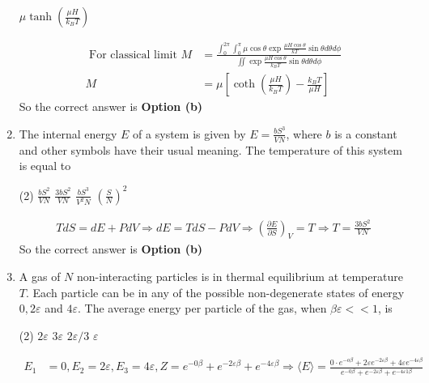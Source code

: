 \begin{enumerate}
\begin{tasks}
		\task[\textbf{d.}] $\mu \tanh \left(\frac{\mu H}{k_{B} T}\right)$
	\end{tasks}
	\begin{answer}
		\begin{align*}
		\text { For classical limit } M&=\frac{\int_{0}^{2 \pi} \int_{0}^{\pi} \mu \cos \theta \exp \frac{\mu H \cos \theta}{k T} \sin \theta d \theta d \phi}{\iint \exp \frac{\mu H \cos \theta}{k_{B} T} \sin \theta d \theta d \phi} \\
		M&=\mu\left[\operatorname{coth}\left(\frac{\mu H}{k_{B} T}\right)-\frac{k_{B} T}{\mu H}\right]
		\end{align*}
		So the correct answer is \textbf{Option (b)}
	\end{answer}
	\item 	The internal energy $E$ of a system is given by $E=\frac{b S^{3}}{V N}$, where $b$ is a constant and other symbols have their usual meaning. The temperature of this system is equal to
	{	}
	\begin{tasks}(2)
		\task[\textbf{a.}]$\frac{b S^{2}}{V N}$
		\task[\textbf{b.}]$\frac{3 b S^{2}}{V N}$
		\task[\textbf{c.}]$\frac{b S^{3}}{V^{2} N}$
		\task[\textbf{d.}] $\left(\frac{S}{N}\right)^{2}$
	\end{tasks}
	\begin{answer}
		\begin{align*}
		T d S=d E+P d V \Rightarrow d E=T d S-P d V \Rightarrow\left(\frac{\partial E}{\partial S}\right)_{V}=T \Rightarrow T=\frac{3 b S^{2}}{V N}
		\end{align*}
		So the correct answer is \textbf{Option (b)}
	\end{answer}
	\item A gas of $N$ non-interacting particles is in thermal equilibrium at temperature $T$. Each particle can be in any of the possible non-degenerate states of energy $0,2 \varepsilon$ and $4 \varepsilon$. The average energy per particle of the gas, when $\beta \varepsilon<<1$, is
	{	}
	\begin{tasks}(2)
		\task[\textbf{a.}]$2 \varepsilon$
		\task[\textbf{b.}] $3 \varepsilon$
		\task[\textbf{c.}]$2 \varepsilon / 3$
		\task[\textbf{d.}]  $\varepsilon$
	\end{tasks}	
	\begin{answer}
		\begin{align*}
		E_{1}&=0, E_{2}=2 \varepsilon, E_{3}=4 \varepsilon, Z=e^{-0 \beta}+e^{-2 \varepsilon \beta}+e^{-4 \varepsilon \beta} \Rightarrow\langle E\rangle=\frac{0 \cdot e^{-o \beta}+2 \varepsilon e^{-2 \varepsilon \beta}+4 \varepsilon e^{-4 \varepsilon \beta}}{e^{-0 \beta}+e^{-2 \varepsilon \beta}+e^{-4 \varepsilon 1 \beta}} \\

\end{align*}
\end{answer}
\end{enumerate}
